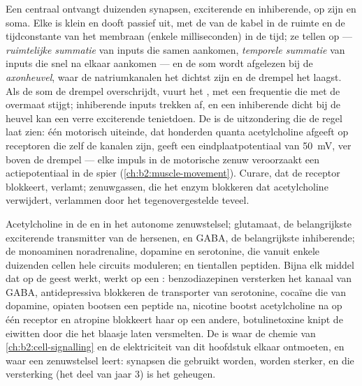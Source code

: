 \begin{proposition}\label{prop:b2:neurons-synapses:integration}
Een centraal  ontvangt duizenden synapsen, exciterende en inhiberende,
op zijn  en soma. Elke  is klein en
dooft passief uit, met de  van de kabel in de ruimte en de
tijdconstante van het membraan (enkele milliseconden) in de tijd; ze tellen
op --- \emph{ruimtelijke summatie} van inputs die samen aankomen,
\emph{temporele summatie} van inputs die snel na elkaar aankomen --- en de som
wordt afgelezen bij de \emph{axonheuvel}, waar de natriumkanalen het dichtst
zijn en de drempel het laagst. Als de som de drempel overschrijdt, vuurt het
, met een frequentie die met de overmaat stijgt; inhiberende inputs
trekken af, en een inhiberende  dicht bij de heuvel kan een verre
exciterende tenietdoen. De  is de uitzondering die
de regel laat zien: één motorisch uiteinde, dat honderden quanta
acetylcholine afgeeft op receptoren die zelf de kanalen zijn, geeft een
eindplaatpotentiaal van \qty{50}{mV}, ver boven de drempel --- elke impuls in
de motorische zenuw veroorzaakt een actiepotentiaal in de spier
(\cref{ch:b2:muscle-movement}). Curare, dat de receptor blokkeert,
verlamt; zenuwgassen, die het enzym blokkeren dat acetylcholine verwijdert,
verlammen door het tegenovergestelde teveel.
\end{proposition}

\begin{example}\label{ex:b2:neurons-synapses:transmitters}
Acetylcholine in de  en in het autonome
zenuwstelsel; glutamaat, de belangrijkste exciterende transmitter van de
hersenen, en GABA, de belangrijkste inhiberende; de monoaminen noradrenaline,
dopamine en serotonine, die vanuit enkele duizenden cellen hele circuits
moduleren; en tientallen peptiden. Bijna elk middel dat op de geest werkt,
werkt op een : benzodiazepinen versterken het kanaal van GABA,
antidepressiva blokkeren de transporter van serotonine, cocaïne die van
dopamine, opiaten bootsen een peptide na, nicotine bootst acetylcholine na op
één receptor en atropine blokkeert haar op een andere, botulinetoxine knipt
de eiwitten door die het blaasje laten versmelten. De  is waar de
chemie van \cref{ch:b2:cell-signalling} en de elektriciteit van dit hoofdstuk
elkaar ontmoeten, en waar een zenuwstelsel leert: synapsen die gebruikt
worden, worden sterker, en die versterking (het deel van jaar 3) is het
geheugen.
\end{example}

